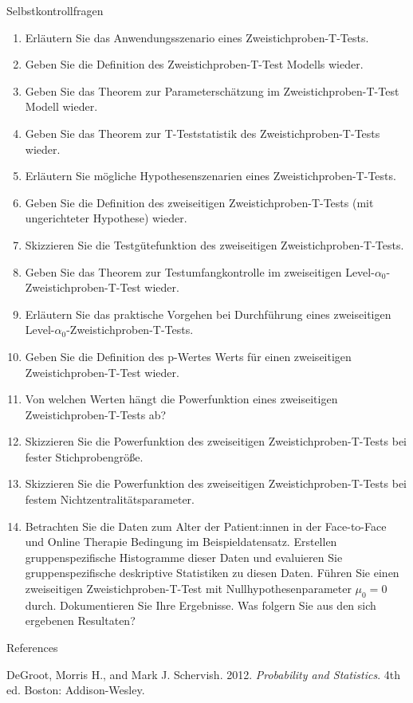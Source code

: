 \documentclass[
  8pt,
  ignorenonframetext,
]{beamer}
\newlength{\cslhangindent}
\newlength{\cslentryspacingunit} %
\newenvironment{CSLReferences}[2] %
 {%
  \setlength{\parindent}{0pt}
  \ifodd #1
  \let\oldpar\par
  \def\par{\hangindent=\cslhangindent\oldpar}
  \fi
  \setlength{\parskip}{#2\cslentryspacingunit}
 }%
 {}
\begin{document}
\begin{frame}{Selbstkontrollfragen}
\protect\hypertarget{selbstkontrollfragen-1}{}
\footnotesize
{}
\begin{enumerate}
\justifying
\itemsep0mm
\setcounter{enumi}{17}
\item Erläutern Sie das Anwendungsszenario eines Zweistichproben-T-Tests.
\item Geben Sie die Definition des Zweistichproben-T-Test Modells wieder.
\item Geben Sie das Theorem zur Parameterschätzung im Zweistichproben-T-Test Modell wieder.
\item Geben Sie das Theorem zur T-Teststatistik des Zweistichproben-T-Tests wieder.
\item Erläutern Sie mögliche Hypothesenszenarien eines Zweistichproben-T-Tests.
\item Geben Sie die Definition des zweiseitigen Zweistichproben-T-Tests (mit ungerichteter Hypothese) wieder.
\item Skizzieren Sie die Testgütefunktion des zweiseitigen Zweistichproben-T-Tests.
\item Geben Sie das Theorem zur Testumfangkontrolle im zweiseitigen Level-$\alpha_0$-Zweistichproben-T-Test wieder.
\item Erläutern Sie das praktische Vorgehen bei Durchführung eines zweiseitigen Level-$\alpha_0$-Zweistichproben-T-Tests.
\item Geben Sie die Definition des p-Wertes Werts für einen zweiseitigen Zweistichproben-T-Test wieder.
\item Von welchen Werten hängt die Powerfunktion eines zweiseitigen Zweistichproben-T-Tests ab?
\item Skizzieren Sie die Powerfunktion des zweiseitigen Zweistichproben-T-Tests bei fester Stichprobengröße.
\item Skizzieren Sie die Powerfunktion des zweiseitigen Zweistichproben-T-Tests bei festem Nichtzentralitätsparameter.
\item Betrachten Sie die Daten zum Alter der Patient:innen in der Face-to-Face und Online Therapie Bedingung im Beispieldatensatz. 
Erstellen gruppenspezifische Histogramme dieser Daten und evaluieren Sie gruppenspezifische deskriptive Statistiken zu diesen Daten. Führen Sie
einen zweiseitigen Zweistichproben-T-Test mit Nullhypothesenparameter $\mu_0 = 0$ durch. Dokumentieren Sie Ihre Ergebnisse.
Was folgern Sie aus den sich ergebenen Resultaten?
\end{enumerate}
\end{frame}

\begin{frame}{References}
\protect\hypertarget{references}{}
\footnotesize

\hypertarget{refs}{}
\begin{CSLReferences}{1}{0}
\leavevmode{}%
DeGroot, Morris H., and Mark J. Schervish. 2012. \emph{Probability and
Statistics}. 4th ed. {Boston}: {Addison-Wesley}.

\end{CSLReferences}
\end{frame}
\end{document}
